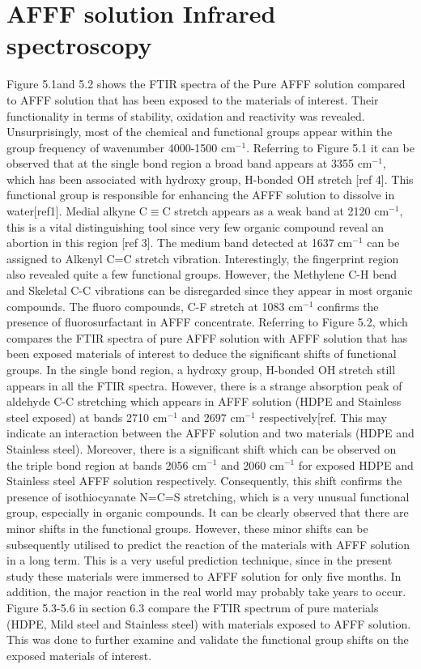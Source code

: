 \documentclass[12pt]{report}
\begin{document}
\section{AFFF solution Infrared spectroscopy}
Figure 5.1and 5.2 shows the FTIR spectra of the Pure AFFF solution compared to AFFF solution that has been exposed to the materials of interest.  Their functionality in terms of stability, oxidation and reactivity was revealed. Unsurprisingly, most of the chemical and functional groups appear within the group frequency of wavenumber 4000-1500 cm$^{-1}$.
Referring to Figure 5.1 it can be observed that at the single bond region a broad band appears at 3355 cm$^{-1}$, which has been associated with hydroxy group, H-bonded OH stretch [ref 4]. This functional group is responsible for enhancing the AFFF solution to dissolve in water[ref1].  Medial alkyne C$\equiv$C stretch appears as a weak band at 2120 cm$^{-1}$, this is a vital distinguishing tool since very few organic compound reveal an abortion in this region [ref 3]. The medium band detected at 1637 cm$^{-1}$ can be assigned to Alkenyl C=C stretch vibration. Interestingly, the fingerprint region also revealed quite a few functional groups. However, the Methylene C-H bend and Skeletal C-C vibrations can be disregarded since they appear in most organic compounds. The fluoro compounds, C-F stretch at 1083 cm$^{-1}$ confirms the presence of fluorosurfactant in AFFF concentrate. 
Referring to Figure 5.2, which compares the FTIR spectra of pure AFFF solution with AFFF solution that has been exposed materials of interest to deduce the significant shifts of functional groups. In the single bond region, a hydroxy group, H-bonded OH stretch still appears in all the FTIR spectra. However, there is a strange absorption peak of aldehyde C-C stretching which appears in AFFF solution (HDPE and Stainless steel exposed) at bands 2710 cm$^{-1}$  and 2697 cm$^{-1}$ respectively[ref. This may indicate an interaction between the AFFF solution and two materials (HDPE and Stainless steel). Moreover, there is a significant shift which can be observed on the triple bond region at bands 2056 cm$^{-1}$ and 2060 cm$^{-1}$ for exposed HDPE and Stainless steel AFFF solution respectively. Consequently, this shift confirms the presence of isothiocyanate N=C=S stretching, which is a very unusual functional group, especially in organic compounds.
It can be clearly observed that there are minor shifts in the functional groups. However, these minor shifts can be subsequently utilised to predict the reaction of the materials with AFFF solution in a long term. This is a very useful prediction technique, since in the present study these materials were immersed to AFFF solution for only five months. In addition, the major reaction in the real world may probably take years to occur. Figure 5.3-5.6 in section 6.3 compare the FTIR spectrum of pure materials (HDPE, Mild steel and Stainless steel) with materials exposed to AFFF solution. This was done to further examine and validate the functional group shifts on the exposed materials of interest.  
  
\end{document}
